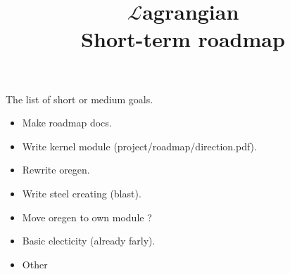 \documentclass[12pt]{article}
\title{$\mathcal{L}$agrangian \\ Short-term roadmap}
\begin{document}
	\maketitle

	The list of short or medium goals.

    \begin{itemize}
		\item Make roadmap docs.
		\item Write kernel module (project/roadmap/direction.pdf).
		\item Rewrite oregen.
		\item Write steel creating (blast).
		\item Move oregen to own module ?
		\item Basic electicity (already farly).
		\item Other
	\end{itemize}
\end{document}
